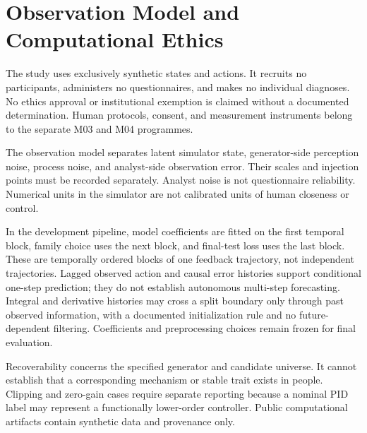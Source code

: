 \section{Observation Model and Computational Ethics}

The study uses exclusively synthetic states and actions. It recruits no participants, administers no questionnaires, and makes no individual diagnoses. No ethics approval or institutional exemption is claimed without a documented determination. Human protocols, consent, and measurement instruments belong to the separate M03 and M04 programmes.

The observation model separates latent simulator state, generator-side perception noise, process noise, and analyst-side observation error. Their scales and injection points must be recorded separately. Analyst noise is not questionnaire reliability. Numerical units in the simulator are not calibrated units of human closeness or control.

In the development pipeline, model coefficients are fitted on the first temporal block, family choice uses the next block, and final-test loss uses the last block. These are temporally ordered blocks of one feedback trajectory, not independent trajectories. Lagged observed action and causal error histories support conditional one-step prediction; they do not establish autonomous multi-step forecasting. Integral and derivative histories may cross a split boundary only through past observed information, with a documented initialization rule and no future-dependent filtering. Coefficients and preprocessing choices remain frozen for final evaluation.

Recoverability concerns the specified generator and candidate universe. It cannot establish that a corresponding mechanism or stable trait exists in people. Clipping and zero-gain cases require separate reporting because a nominal PID label may represent a functionally lower-order controller. Public computational artifacts contain synthetic data and provenance only.
